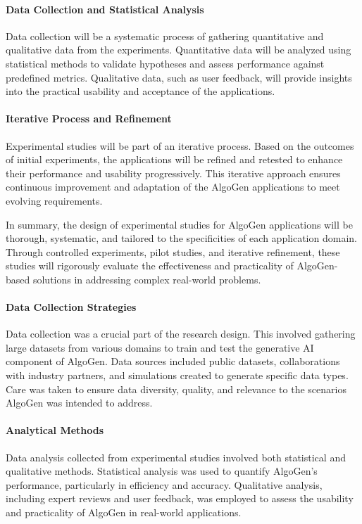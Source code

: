 \documentclass{article}
\begin{document}
\paragraph{Data Collection and Statistical Analysis}
Data collection will be a systematic process of gathering quantitative and qualitative data from the experiments. Quantitative data will be analyzed using statistical methods to validate hypotheses and assess performance against predefined metrics. Qualitative data, such as user feedback, will provide insights into the practical usability and acceptance of the applications.

\paragraph{Iterative Process and Refinement}
Experimental studies will be part of an iterative process. Based on the outcomes of initial experiments, the applications will be refined and retested to enhance their performance and usability progressively. This iterative approach ensures continuous improvement and adaptation of the AlgoGen applications to meet evolving requirements.

In summary, the design of experimental studies for AlgoGen applications will be thorough, systematic, and tailored to the specificities of each application domain. Through controlled experiments, pilot studies, and iterative refinement, these studies will rigorously evaluate the effectiveness and practicality of AlgoGen-based solutions in addressing complex real-world problems.



\paragraph{Data Collection Strategies}
Data collection was a crucial part of the research design. This involved gathering large datasets from various domains to train and test the generative AI component of AlgoGen. Data sources included public datasets, collaborations with industry partners, and simulations created to generate specific data types. Care was taken to ensure data diversity, quality, and relevance to the scenarios AlgoGen was intended to address.

\paragraph{Analytical Methods}
Data analysis collected from experimental studies involved both statistical and qualitative methods. Statistical analysis was used to quantify AlgoGen’s performance, particularly in efficiency and accuracy. Qualitative analysis, including expert reviews and user feedback, was employed to assess the usability and practicality of AlgoGen in real-world applications.
\end{document}
